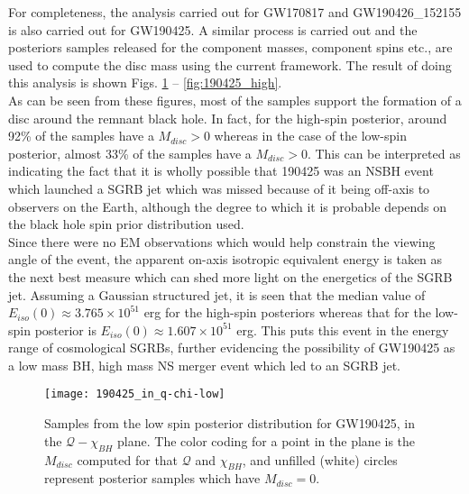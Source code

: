         For completeness, the analysis carried out for GW170817 and GW190426\_152155 is
        also carried out for GW190425. A similar process is carried out and the
        posteriors samples released for the component masses, component spins etc., are
        used to compute the disc mass using the current framework. The result of doing
        this analysis is shown Figs. \ref{fig:190425_low} -- \ref{fig:190425_high}.\\
        As can be seen from these figures, most of the samples support the formation of
        a disc around the remnant black hole. In fact, for the high-spin posterior,
        around 92\% of the samples have a $M_{disc} > 0$ whereas in the case of
        the low-spin posterior, almost 33\% of the samples have a $M_{disc} > 0$.
        This can be interpreted as indicating the fact that it is wholly possible that
        190425 was an NSBH event which launched a SGRB jet which was missed because of
        it being off-axis to observers on the Earth, although the degree to which it is
        probable depends on the black hole spin prior distribution used.\\
        Since there were no EM observations which would help constrain the viewing
        angle of the event, the apparent on-axis isotropic equivalent energy is taken as
        the next best measure which can shed more light on the energetics of the SGRB
        jet. Assuming a Gaussian structured jet, it is seen that the median value of
        $E_{iso}(0) \approx 3.765 \times 10^{51}$ erg for the high-spin posteriors
        whereas that for the low-spin posterior is $E_{iso}(0) \approx 1.607 \times
        10^{51}$ erg. This puts this event in the energy range of cosmological SGRBs,
        further evidencing the possibility of GW190425 as a low mass BH, high mass NS
        merger event which led to an SGRB jet.

        \begin{figure}[ht]
            \centering
            \texttt{[image: 190425\_in\_q-chi-low]}
            \caption[$M_{disc}$ for GW190425's Low Spin Posterior Distribution]
            {
                Samples from the low spin posterior distribution for GW190425, in the
                $\mathcal{Q}-\chi_{BH}$ plane. The color coding for a point in the plane
                is the $M_{disc}$ computed for that $\mathcal{Q}$ and $\chi_{BH}$, and
                unfilled (white) circles represent posterior samples which have
                $M_{disc} = 0$.
            }
            \label{fig:190425_low}
        \end{figure}

